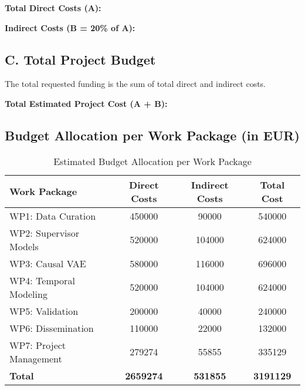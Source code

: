 \textbf{Total Direct Costs (A): }

\textbf{Indirect Costs (B = 20\% of A): }

\subsection*{C. Total Project Budget}
The total requested funding is the sum of total direct and indirect costs.

\textbf{Total Estimated Project Cost (A + B):} 

\subsection*{Budget Allocation per Work Package (in EUR)}

\begin{table}[H]
\centering
\caption{Estimated Budget Allocation per Work Package}
\label{tab:budget_wp}
\begin{tabular}{lS[table-format=7.0]S[table-format=6.0]S[table-format=7.0]}
\toprule
\textbf{Work Package} & {\textbf{Direct Costs}} & {\textbf{Indirect Costs}} & {\textbf{Total Cost}} \\
\midrule
WP1: Data Curation & 450000 & 90000 & 540000 \\
WP2: Supervisor Models & 520000 & 104000 & 624000 \\
WP3: Causal VAE & 580000 & 116000 & 696000 \\
WP4: Temporal Modeling & 520000 & 104000 & 624000 \\
WP5: Validation & 200000 & 40000 & 240000 \\
WP6: Dissemination & 110000 & 22000 & 132000 \\
WP7: Project Management & 279274 & 55855 & 335129 \\
\midrule
\textbf{Total} & {\textbf{2659274}} & {\textbf{531855}} & {\textbf{3191129}} \\
\bottomrule
\end{tabular}
\end{table}